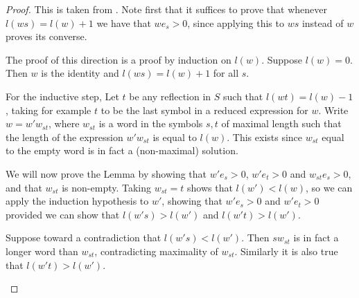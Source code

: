 \documentclass{article}
\theoremstyle{definition}
\begin{document}
\begin{proof}
This is taken from \cite{humphreys1990}. Note first that it suffices to prove that whenever $l(ws) = l(w) + 1$ we have that $we_s > 0$, since applying this to $ws$ instead of $w$ proves its converse. 

The proof of this direction is a proof by induction on $l(w)$. Suppose $l(w) = 0$. Then $w$ is the identity and $l(ws) = l(w) + 1$ for all $s$. 

For the inductive step, Let $t$ be any reflection in $S$ such that $l(wt) = l(w) - 1$, taking for example $t$ to be the last symbol in a reduced expression for $w$. Write $w = w'w_{st}$, where $w_{st}$ is a word in the symbols $s, t$ of maximal length such that the length of the expression $w'w_{st}$ is equal to $l(w)$. This exists since $w_{st}$ equal to the empty word is in fact a (non-maximal) solution.

We will now prove the Lemma by showing that $w'e_s > 0$, $w'e_t > 0$ and $w_{st}e_s > 0$, and that $w_{st}$ is non-empty. Taking $w_{st} = t$ shows that $l(w') < l(w)$, so we can apply the induction hypothesis to $w'$, showing that $w'e_s > 0$ and $w'e_t > 0$ provided we can show that $l(w's) > l(w')$ and $l(w't) > l(w')$. 

Suppose toward a contradiction that $l(w's) < l(w')$. Then $sw_{st}$ is in fact a longer word than $w_{st}$, contradicting maximality of $w_{st}$. Similarly it is also true that $l(w't) > l(w')$.


\begin{figure}[ht]
\centering
\begin{minipage}{.5\textwidth}
\centering
{}
\end{minipage}%
\begin{minipage}{.5\textwidth}
\centering

\end{minipage}
\end{figure}
\end{proof}
\end{document}
